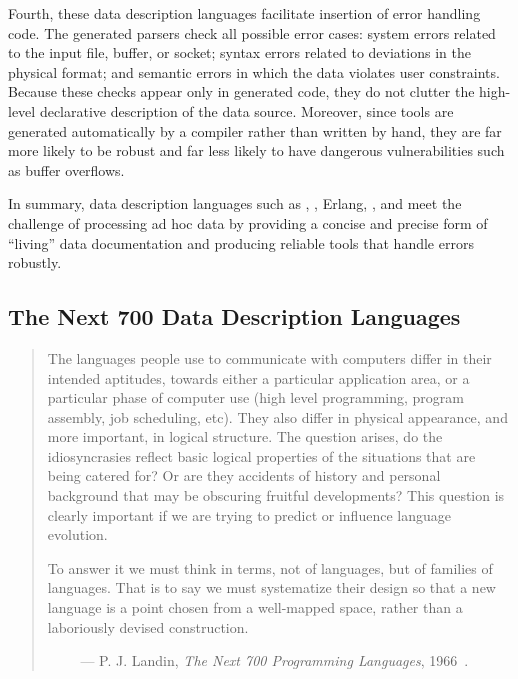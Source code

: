 Fourth, these data description languages 
facilitate insertion of error handling code. 
The generated parsers check all possible
error cases: system errors related to the input file, buffer, or
socket; syntax errors related to deviations in the physical format;
and semantic errors in which the data violates user
constraints. Because these checks appear only in generated code, they
do not clutter the high-level declarative description of the data
source. Moreover, since tools are generated automatically by a
compiler rather than written by hand, they are far more likely to be
robust and far less likely to have dangerous vulnerabilities such as
buffer overflows. 

In summary, data description languages such as \datascript{},
\packettypes{}, Erlang, \blt{}, and \pads{} meet the challenge of
processing ad hoc data by providing a concise and precise form of
``living'' data documentation and producing reliable tools that handle
errors robustly.


\subsection{The Next 700 Data Description Languages}

\begin {quote}
The languages people use to communicate with computers differ in their intended aptitudes, towards either a
particular application area, or a particular phase of computer use (high level programming, program assembly,
job scheduling, etc). They also differ in physical appearance, and more important, in logical structure. The question arises, do the idiosyncrasies reflect basic logical
properties of the situations that are being catered for?
Or are they accidents of history and personal background
that may be obscuring fruitful developments? This
question is clearly important if we are trying to predict or
influence language evolution.

To answer it we must think in terms, not of languages,
but of families of languages. That is to say we must
systematize their design so that a new language is a point
chosen from a well-mapped space, rather than a laboriously
devised construction.

$\qquad$ --- P. J. Landin, {\em The Next 700 Programming Languages}, 
1966~\cite{landin:700}.
\end{quote}


